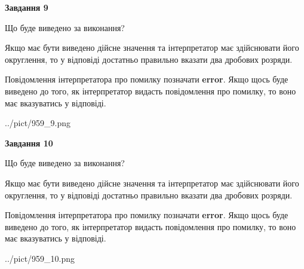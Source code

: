 \documentclass[12pt, ukrainian]{article}
\begin{document}
{\begin {Large}
{\begin {center}\textbf{Завдання 9}\end {center}}\par
Що буде виведено за виконання? \par

Якщо має бути виведено дійсне значення та інтерпретатор має здійснювати його округлення, 
то у відповіді достатньо правильно вказати два дробових розряди.

Повідомлення інтерпретатора про помилку позначати \textbf{error}.
Якщо щось буде виведено до того, як інтерпретатор видасть повідомлення про помилку, 
то воно має вказуватись у відповіді. \par

\begin{center}
	{../pict/959_9.png}
\end{center}
\newpage

{\begin {center}\textbf{Завдання 10}\end {center}}\par
Що буде виведено за виконання? \par

Якщо має бути виведено дійсне значення та інтерпретатор має здійснювати його округлення, 
то у відповіді достатньо правильно вказати два дробових розряди.

Повідомлення інтерпретатора про помилку позначати \textbf{error}.
Якщо щось буде виведено до того, як інтерпретатор видасть повідомлення про помилку, 
то воно має вказуватись у відповіді. \par

\begin{center}
	{../pict/959_10.png}
\end{center}
\newpage

\end {Large}}
\end{document}
